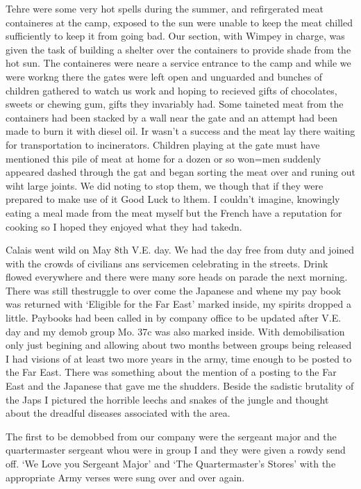Tehre were some very hot spells during the summer, and refirgerated
meat containeres at the camp, exposed to the sun were unable to keep
the meat chilled sufficiently to keep it from going bad. Our section,
with \corporal Wimpey in charge, was given the task of building a
shelter over the containers to provide shade from the hot sun. The
containeres were neare a service entrance to the camp and while we
were workng there the gates were left open and unguarded and bunches
of children gathered to watch us work and hoping to recieved gifts of
chocolates, sweets or chewing gum, gifts they invariably had. Some
taineted meat from the containers had been stacked by a wall near the
gate and an attempt had been made to burn it with diesel oil. Ir
wasn't a success and the meat lay there waiting for transportation to
incinerators. Children playing at the gate must have mentioned this
pile of meat at home for a dozen or so won=men suddenly appeared
dashed through the gat and began sorting the meat over and runing out
wiht large joints. We did noting to stop them, we though that if they
were prepared to make use of it Good Luck to lthem. I couldn't
imagine, knowingly eating a meal made from the meat myself but the
French have a reputation for cooking so I hoped they enjoyed what they
had takedn.

Calais went wild on May 8th V.E. day. We had the day free from duty
and joined with the crowds of civilians ans servicemen celebrating in
the streets. Drink flowed everywhere and there were many sore heads on
parade the next morning. There was still thestruggle to over come the
Japanese and whene my pay book was returned with `Eligible for the Far
East' marked inside, my spirits dropped a little. Paybooks had been
called in by company office to be updated after V.E. day and my demob
group Mo. 37c was also marked inside. With demobilisation only just
begining and allowing about two months between groups being released I
had visions of at least two more years in the army, time enough to be
posted to the Far East. There was something about the mention of a
posting to the Far East and the Japanese that gave me the
shudders. Beside the sadistic brutality of the Japs I pictured the
horrible leechs and snakes of the jungle and thought about the
dreadful diseases associated with the area.

The first to be demobbed from our company were the sergeant major and
the quartermaster sergeant whou were in group I and they were given a
rowdy send off. `We Love you Sergeant Major' and `The Quartermaster's
Stores' with the appropriate Army verses were sung over and over
again.

